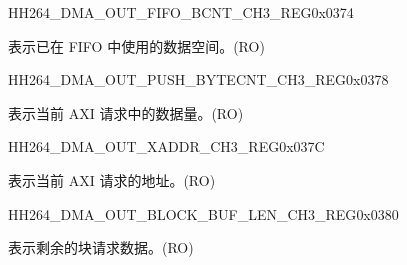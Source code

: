 \begin{register}{H}{H264\_DMA\_OUT\_FIFO\_BCNT\_CH3\_REG}{0x0374}\label{regdesc:H264DMAOUTFIFOBCNTCH3REG}
%
%
\regnewline%
\begin{regdesc}\begin{reglist}
\label{fielddesc:H264DMAOUTCMDFIFOOUTFIFOBCNTCH3}\item [H264\_DMA\_OUT\_CMDFIFO\_OUTFIFO\_BCNT\_CH3] 表示已在 FIFO 中使用的数据空间。(RO)
\end{reglist}\end{regdesc}
\end{register}


\begin{register}{H}{H264\_DMA\_OUT\_PUSH\_BYTECNT\_CH3\_REG}{0x0378}\label{regdesc:H264DMAOUTPUSHBYTECNTCH3REG}
%
%
\regnewline%
\begin{regdesc}\begin{reglist}
\label{fielddesc:H264DMAOUTCMDFIFOPUSHBYTECNTCH3}\item [H264\_DMA\_OUT\_CMDFIFO\_PUSH\_BYTECNT\_CH3] 表示当前 AXI 请求中的数据量。(RO)
\end{reglist}\end{regdesc}
\end{register}


\begin{register}{H}{H264\_DMA\_OUT\_XADDR\_CH3\_REG}{0x037C}\label{regdesc:H264DMAOUTXADDRCH3REG}
%
\regnewline%
\begin{regdesc}\begin{reglist}
\label{fielddesc:H264DMAOUTCMDFIFOXADDRCH3}\item [H264\_DMA\_OUT\_CMDFIFO\_XADDR\_CH3] 表示当前 AXI 请求的地址。(RO)
\end{reglist}\end{regdesc}
\end{register}


\begin{register}{H}{H264\_DMA\_OUT\_BLOCK\_BUF\_LEN\_CH3\_REG}{0x0380}\label{regdesc:H264DMAOUTBLOCKBUFLENCH3REG}
%
%
\regnewline%
\begin{regdesc}\begin{reglist}
\label{fielddesc:H264DMAOUTBLOCKBUFLENCH3}\item [H264\_DMA\_OUT\_BLOCK\_BUF\_LEN\_CH3] 表示剩余的块请求数据。(RO)
\end{reglist}\end{regdesc}
\end{register}

